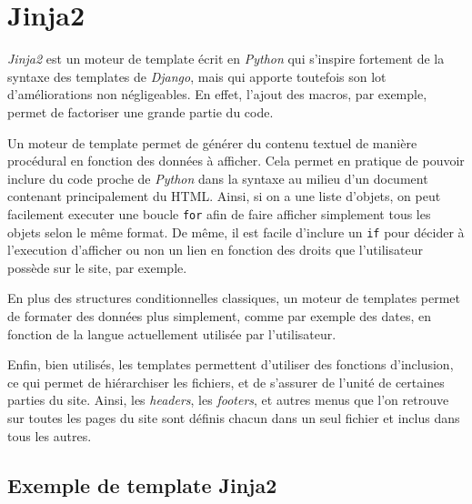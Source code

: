 \documentclass[a4paper]{report}
\begin{document}
\section{Jinja2}
\label{sec:jinja2}
\par \emph{Jinja2} est un moteur de template écrit en \emph{Python}  qui s'inspire fortement de la syntaxe des templates de
\emph{Django}, mais qui apporte toutefois son lot d'améliorations non négligeables. En effet, l'ajout des macros, par
exemple, permet de factoriser une grande partie du code.
\par Un moteur de template permet de générer du contenu textuel de manière procédural en fonction des données à
afficher. Cela permet en pratique de pouvoir inclure du code proche de \emph{Python} dans la syntaxe au milieu d'un
document contenant principalement du HTML. Ainsi, si on a une liste d'objets, on peut facilement executer une boucle
\verb#for# afin de faire afficher simplement tous les objets selon le même format.
\noindent De même, il est facile d'inclure un \verb#if# pour décider à l'execution d'afficher ou non un lien en fonction
des droits que l'utilisateur possède sur le site, par exemple.
\par En plus des structures conditionnelles classiques, un moteur de templates permet de formater des données plus
simplement, comme par exemple des dates, en fonction de la langue actuellement utilisée par l'utilisateur.
\par Enfin, bien utilisés, les templates permettent d'utiliser des fonctions d'inclusion, ce qui permet de hiérarchiser
les fichiers, et de s'assurer de l'unité de certaines parties du site. Ainsi, les \emph{headers}, les \emph{footers}, et
autres menus que l'on retrouve sur toutes les pages du site sont définis chacun dans un seul fichier et inclus dans
tous les autres.

\subsection{Exemple de template Jinja2}
\label{sub:exemple_de_template_jinja2}
\end{document}

